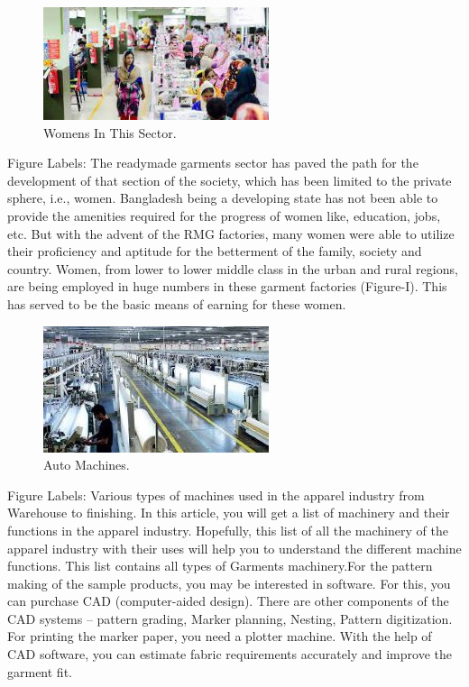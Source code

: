 \documentclass[conference]{IEEEtran}
\begin{document}
\begin{figure}[htbp]
\centerline{\includegraphics{tex.jpg}}
\caption{Womens In This Sector.}
\label{fig}
\end{figure}

Figure Labels: The readymade garments sector has paved the path for the development of that section of the society, which has been limited to the private sphere, i.e., women. Bangladesh being a developing state has not been able to provide the amenities required for the progress of women like, education, jobs, etc. But with the advent of the RMG factories, many women were able to utilize their proficiency and aptitude for the betterment of the family, society and country. Women, from lower to lower middle class in the urban and rural regions, are being employed in huge numbers in these garment factories (Figure-I). This has served to be the basic means of earning for these women.

\begin{figure}[htbp]
\centerline{\includegraphics{tex 1.jpg}}
\caption{Auto Machines.}
\label{fig}
\end{figure}

Figure Labels: Various types of machines used in the apparel industry from Warehouse to finishing. In this article, you will get a list of machinery and their functions in the apparel industry.  Hopefully, this list of all the machinery of the apparel industry with their uses will help you to understand the different machine functions. This list contains all types of Garments machinery.For the pattern making of the sample products, you may be interested in software. For this, you can purchase CAD (computer-aided design). There are other components of the CAD systems – pattern grading, Marker planning, Nesting, Pattern digitization. For printing the marker paper, you need a plotter machine. With the help of CAD software, you can estimate fabric requirements accurately and improve the garment fit.
\end{document}

